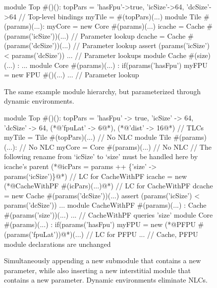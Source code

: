\begin{figure}
\centering
\begin{phdl}
module Top #()():
  topPars = {'hasFpu'->true, 'icSize'->64, 'dcSize'->64} // Top-level bindings
  myTile = #(topPars)(...)
module Tile #(params)(...):
  myCore = new Core  #(params)(...)
  icache = Cache #(params('icSize'))(...)          // Parameter lookup
  dcache = Cache #(params('dcSize'))(...)          // Parameter lookup
  assert (params('icSize') < params('dcSize')) ... // Parameter lookups
module Cache #(size)(...) : ...
module Core  #(params)(...) :
  if(params('hasFpu') myFPU = new FPU #()(...) ... // Parameter lookup
\end{phdl} 
\caption{The same example module hierarchy, but parameterized through dynamic environments.}
\label{fig:env}
\end{figure}

\begin{figure}
\centering
\begin{phdl}
module Top #()():
  topPars = {'hasFpu' -> true, 'icSize' -> 64, 'dcSize' -> 64, (*@\textcolor[rgb]{0.8,0,0}{'fpuLat' -> 6}@*), (*@\textcolor[rgb]{1,0,0}{'dist' -> 16}@*) } // TLCs
  myTile = Tile #(topPars)(...)                                  // No NLC
module Tile #(params)(...):                                      // No NLC
  myCore = Core #(params)(...)                                   // No NLC
  // The following rename from `icSize' to `size' must be handled here by icache's parent
  (*@\textcolor[rgb]{1,0,0}{icPars = params ++ \{'size' -> params(`icSize')\}}@*)                // LC for CacheWithPF
  icache = new (*@\textcolor[rgb]{1,0,0}{CacheWithPF \#(icPars)(...)}@*)                        // LC for CacheWithPF
  dcache = new Cache #(params('dcSize'))(...)
  assert (params('icSize') < params('dcSize')) ...
module CacheWithPF #(params)(...) :
  Cache #(params('size'))(...) ... // CacheWithPF queries 'size'
module Core #(params)(...) :
   if(params('hasFpu') myFPU = new (*@\textcolor[rgb]{.8,0,0}{PFPU \#(params('fpuLat'))}@*)(...) // LC for PFPU
... // Cache, PFPU module declarations are unchanged
\end{phdl} 
\caption{Simultaneously appending a new submodule that contains a new parameter, while also inserting
a new interstitial module that contains a new parameter. Dynamic environments eliminate NLCs.}
\label{fig:env-delta}
\end{figure}

